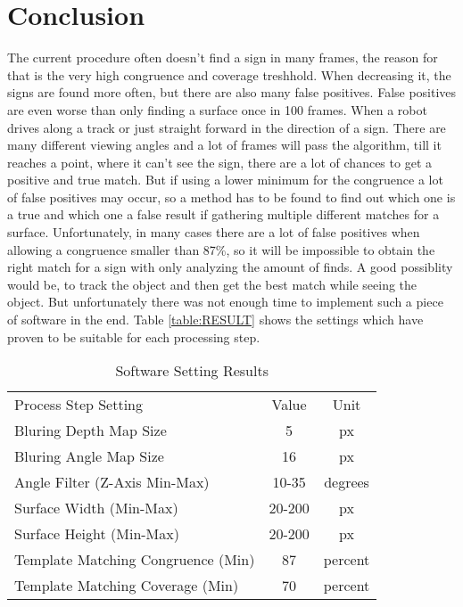 \chapter{Conclusion}
\graphicspath{{./Conclusion/img/}}

The current procedure often doesn't find a sign in many frames, the reason for that is the very high congruence and coverage
treshhold. When decreasing it, the signs are found more often, but there are also many false positives. False positives are
even worse than only finding a surface once in 100 frames. When a robot drives along a track or just 
straight forward in the direction of a sign. There are many different viewing angles and a lot of frames will pass the algorithm,
till it reaches a point, where it can't see the sign, there are a lot of chances to get a positive and true match. But if
using a lower minimum for the congruence a lot of false positives may occur, so a method has to be found to find out
which one is a true and which one a false result if gathering multiple different matches for a surface.
Unfortunately, in many cases there are a lot of false positives when allowing a congruence smaller than 87\%, so 
it will be impossible to obtain the right match for a sign with only analyzing the amount of finds.
A good possiblity would be, to track the object and then get the best match while seeing the object.
But unfortunately there was not enough time to implement such a piece of software in the end. 
Table \vref{table:RESULT} shows the settings which have proven to be suitable for each processing step.

\begin{table}[H]
	\centering
	\begin{tabular}{lcc}
		Process Step Setting 							   & Value                 & Unit \\
		Bluring Depth Map Size							   & 5\footnotemark[1]     & px   \\
		Bluring Angle Map Size							   & 16\footnotemark[1]    & px   \\
		Angle Filter (Z-Axis Min-Max)                      & 10-35                 & degrees \\
		Surface Width (Min-Max)                            & 20-200                & px \\
		Surface Height (Min-Max)                           & 20-200                & px \\
		Template Matching Congruence (Min)                 & 87                    & percent \\
		Template Matching Coverage (Min)                   & 70                    & percent \\
	\end{tabular}
\caption{Software Setting Results}
\label{table:RESULT}
\end{table}

